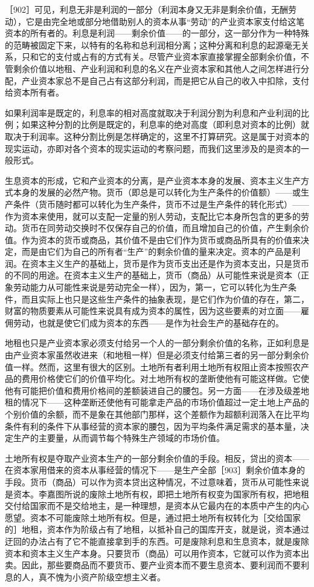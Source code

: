 
［902］可见，利息无非是利润的一部分（利润本身又无非是剩余价值，无酬劳动），它是由完全地或部分地借助别人的资本从事“劳动”的产业资本家支付给这笔资本的所有者的。利息是利润——剩余价值——的一部分，这一部分作为一种特殊的范畴被固定下来，以特有的名称和总利润相分离；这种分离和利息的起源毫无关系，只和它的支付或占有的方式有关。尽管产业资本家直接掌握全部剩余价值，不管剩余价值以地租、产业利润和利息的名义在产业资本家和其他人之间怎样进行分配，产业资本家总不是自己占有这部分利润，而是把它从自己的收入中扣除，支付给资本所有者。

如果利润率是既定的，利息率的相对高度就取决于利润分割为利息和产业利润的比例；如果这种分割的比例是既定的，利息率的绝对高度（即利息对资本的比例）就取决于利润率。这种分割比例是怎样确定的，这里不打算研究。这是属于对资本的现实运动，亦即对各个资本的现实运动的考察问题，而我们这里涉及的是资本的一般形式。

生息资本的形成，它和产业资本的分离，是产业资本本身的发展、资本主义生产方式本身的发展的必然产物。货币（即总是可以转化为生产条件的价值额）——或生产条件（货币随时都可以转化为生产条件，货币不过是生产条件的转化形式）——作为资本来使用，就可以支配一定量的别人劳动，支配比它本身所包含的更多的劳动。货币在同劳动交换时不仅保存自己的价值，而且增加自己的价值，产生剩余价值。作为资本的货币或商品，其价值不是由它们作为货币或商品所具有的价值来决定，而是由它们为自己的所有者“生产”的剩余价值的量来决定。资本的产品是利润。在资本主义生产的基础上，货币是作为货币支出还是作为资本支出，只是货币的不同的用途。在资本主义生产的基础上，货币（商品）从可能性来说是资本（正象劳动能力从可能性来说是劳动完全一样），因为，第一，它可以转化为生产条件，而且实际上也只是这些生产条件的抽象表现，是它们作为价值的存在，第二，财富的物质要素从可能性来说具有成为资本的属性，因为这些要素的对立面——雇佣劳动，也就是使它们成为资本的东西——是作为社会生产的基础存在的。

地租也只是产业资本家必须支付给另一个人的一部分剩余价值的名称，正如利息是由产业资本家虽然收进来（和地租一样）但是必须支付给第三者的另一部分剩余价值一样。然而，这里有很大的区别。土地所有者利用土地所有权阻止资本按照农产品的费用价格使它们的价值平均化。对土地所有权的垄断使他有可能这样做。它使他有可能把价值和费用价格间的差额装进自己的腰包。另一方面——在涉及级差地租的情况下——这种垄断还使他有可能拿走产品的市场价值超过一定土地上产品的个别价值的余额，而不是象在其他部门那样，这个差额作为超额利润落入在比平均条件有利的条件下从事经营的资本家的腰包，因为平均条件满足需求的基本量，决定生产的主要量，从而调节每个特殊生产领域的市场价值。

土地所有权是夺取产业资本生产的一部分剩余价值的手段。相反，贷出的资本——在资本家用借来的资本从事经营的情况下——是生产全部［903］剩余价值本身的手段。货币（商品）可以作为资本贷出这种情况，不过意味着，货币从可能性来说是资本。李嘉图所说的废除土地所有权，即把土地所有权变为国家所有权，把地租交付给国家而不是交给地主，是一种理想，是资本从它最内在的本质中产生的内心愿望。资本不可能废除土地所有权。但是，通过把土地所有权转化为［交给国家的］地租，资本作为阶级占有了地租，以抵补自己的国库开支，就是说，资本通过迂回的办法占有了它不能直接拿到手的东西。可是废除利息和生息资本，就是废除资本和资本主义生产本身。只要货币（商品）可以用作资本，它就可以作为资本出卖。因此，那些要商品而不要货币、要产业资本而不要生息资本、要利润而不要利息的人，真不愧为小资产阶级空想主义者。

